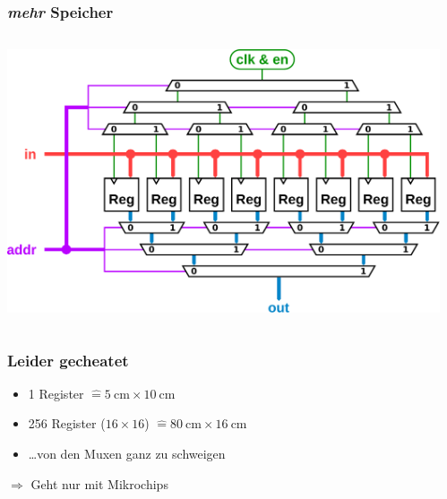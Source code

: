 \documentclass[t,aspectratio=169,usenames,dvipsnames]{beamer}
\begin{document}
\begin{frame}
  \frametitle{\emph{mehr} Speicher}

  \begin{columns}
    \begin{column}{.7\textwidth}
      \includegraphics[width=\textwidth]{memory.pdf}
    \end{column}
    \begin{column}{.25\textwidth}
    \end{column}
  \end{columns}

\end{frame}

\begin{frame}
  \frametitle{Leider gecheatet}

  \begin{itemize}
  \item 1 Register ${} \mathrel{\hat=} \qty{5}{\centi\metre} \times \qty{10}{\centi\metre}$
  \item 256 Register ($16 \times 16$) ${} \mathrel{\hat=} \qty{80}{\centi\metre} \times \qty{16}{\centi\metre}$
  \item \ldots von den Muxen ganz zu schweigen
  \end{itemize}

  \bigskip

  $\Rightarrow$ Geht nur mit Mikrochips

\end{frame}
\end{document}
